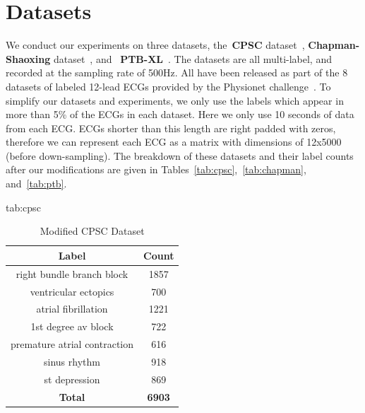 \documentclass[pmlr,twocolumn]{jmlr}%
\begin{document}
\section{Datasets}
\label{datasets}

We conduct our experiments on three datasets, the~\textbf{CPSC} dataset~\citep{liu2018open}, \textbf{Chapman-Shaoxing} dataset~\citep{zheng202012}, and ~\textbf{PTB-XL}~\citep{wagner2020ptb}. The datasets are all multi-label, and recorded at the sampling rate of 500Hz. All have been released as part of the 8 datasets of labeled 12-lead ECGs provided by the Physionet challenge~\citep{reyna2021will,reyna4issues}.
To simplify our datasets and experiments, we only use the labels which appear in more than 5\% of the ECGs in each dataset. Here we only use 10 seconds of data from each ECG. ECGs shorter than this length are right padded with zeros, therefore we can represent each ECG as a matrix with dimensions of 12x5000 (before down-sampling).
The breakdown of these datasets and their label counts after our modifications are given in Tables~\ref{tab:cpsc},~\ref{tab:chapman}, and~\ref{tab:ptb}.
\begin{table}[tbp]

\floatconts
  {tab:cpsc}%
  {\caption{Modified CPSC Dataset}}%
  {
\begin{tabular}{|c|c|}
 \hline
Label & Count \\
 \hline
right bundle branch block    &  1857 \\
ventricular ectopics         &   700 \\
atrial fibrillation          &  1221 \\
1st degree av block          &   722 \\
premature atrial contraction &   616 \\
sinus rhythm                 &   918 \\
st depression                &   869 \\
 \hline
\textbf{Total} & \textbf{6903}\\
\hline
\end{tabular}
  }
\end{table}
\end{document}
